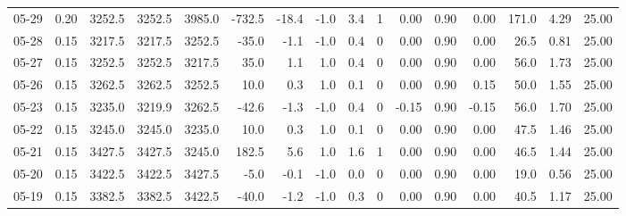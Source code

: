 \begin{threeparttable}
{\begin{tabular}{lrrrrrrrrrrrrrrr}
  05-29 &     0.20 & 3252.5 & 3252.5 & 3985.0 &     -732.5 &          -18.4 &                     -1.0 &                 3.4 &              1 &       0.00 &      0.90 &           0.00 &            171.0 &            4.29 &                  25.00 \\
  05-28 &     0.15 & 3217.5 & 3217.5 & 3252.5 &      -35.0 &           -1.1 &                     -1.0 &                 0.4 &              0 &       0.00 &      0.90 &           0.00 &             26.5 &            0.81 &                  25.00 \\
  05-27 &     0.15 & 3252.5 & 3252.5 & 3217.5 &       35.0 &            1.1 &                      1.0 &                 0.4 &              0 &       0.00 &      0.90 &           0.00 &             56.0 &            1.73 &                  25.00 \\
  05-26 &     0.15 & 3262.5 & 3262.5 & 3252.5 &       10.0 &            0.3 &                      1.0 &                 0.1 &              0 &       0.00 &      0.90 &           0.15 &             50.0 &            1.55 &                  25.00 \\
  05-23 &     0.15 & 3235.0 & 3219.9 & 3262.5 &      -42.6 &           -1.3 &                     -1.0 &                 0.4 &              0 &      -0.15 &      0.90 &          -0.15 &             56.0 &            1.70 &                  25.00 \\
  05-22 &     0.15 & 3245.0 & 3245.0 & 3235.0 &       10.0 &            0.3 &                      1.0 &                 0.1 &              0 &       0.00 &      0.90 &           0.00 &             47.5 &            1.46 &                  25.00 \\
  05-21 &     0.15 & 3427.5 & 3427.5 & 3245.0 &      182.5 &            5.6 &                      1.0 &                 1.6 &              1 &       0.00 &      0.90 &           0.00 &             46.5 &            1.44 &                  25.00 \\
  05-20 &     0.15 & 3422.5 & 3422.5 & 3427.5 &       -5.0 &           -0.1 &                     -1.0 &                 0.0 &              0 &       0.00 &      0.90 &           0.00 &             19.0 &            0.56 &                  25.00 \\
  05-19 &     0.15 & 3382.5 & 3382.5 & 3422.5 &      -40.0 &           -1.2 &                     -1.0 &                 0.3 &              0 &       0.00 &      0.90 &           0.00 &             40.5 &            1.17 &                  25.00 \\

\end{tabular}}
\end{threeparttable}
